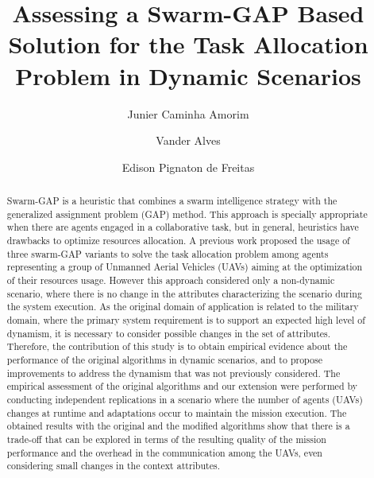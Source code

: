 \documentclass[review]{elsarticle}
\newcommand{\uavs}{UAVs}
\begin{document}
\begin{frontmatter}
	
\title{Assessing a Swarm-GAP Based Solution for the Task Allocation Problem in Dynamic Scenarios}

\author[unbaddress]{Junier Caminha Amorim}

\author[unbaddress]{Vander Alves}


\author[ufrgsaddress]{Edison Pignaton de Freitas}

\address[unbaddress]{Computation Science Department University of Brasilia, Brazil}
\address[ufrgsaddress]{Institute of Informatics Federal University of Rio Grande do Sul, Brazil}

\begin{abstract}
Swarm-GAP is a heuristic that combines a swarm intelligence strategy with the generalized assignment problem (GAP) method. This approach is specially appropriate when there are agents engaged in a collaborative task, but in general, heuristics have drawbacks to optimize resources allocation. A previous work proposed the usage of three swarm-GAP variants to solve the task allocation problem among agents representing a group of Unmanned Aerial Vehicles (\uavs) aiming at the optimization of their resources usage. However this approach considered only a non-dynamic scenario, where there is no change in the attributes characterizing the scenario during the system execution. As the original domain of application is related to the military domain, where the primary system requirement is to support an expected high level of dynamism, it is necessary to consider possible changes in the set of attributes. Therefore, the contribution of this study is to obtain empirical evidence about the performance of the original algorithms in dynamic scenarios, and to propose improvements to address the dynamism that was not previously considered. The empirical assessment of the original algorithms and our extension were performed by conducting independent replications in a scenario where the number of agents (\uavs) changes at runtime and adaptations occur to maintain the mission execution. The obtained results with the original and the modified algorithms show that there is a trade-off that can be explored in terms of the resulting quality of the mission performance and the overhead in the communication among the \uavs, even considering small changes in the context attributes. 
\end{abstract}



\end{frontmatter}
\end{document}
